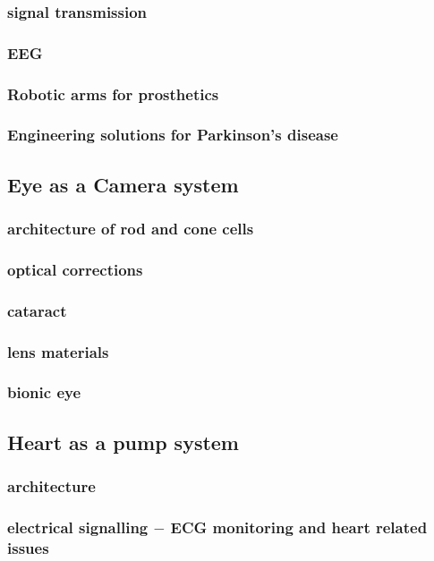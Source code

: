 \documentclass{article}
\begin{document}
	\subsubsection{signal transmission}
	\subsubsection{EEG}
	\subsubsection{Robotic arms for prosthetics}
	\subsubsection{Engineering solutions for Parkinson’s disease}

	\subsection{Eye as a Camera system}
	\subsubsection{architecture of rod and cone cells}
	\subsubsection{optical corrections}
	\subsubsection{cataract}
	\subsubsection{lens materials}
	\subsubsection{bionic eye}

	\subsection{Heart as a pump system}
	\subsubsection{architecture}
	\subsubsection{electrical signalling $-$ ECG monitoring and heart related issues}
\end{document}

